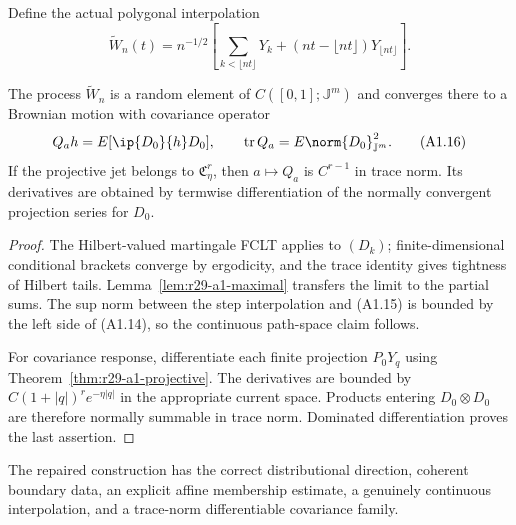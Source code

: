 Define the actual polygonal interpolation
\[
 \widetilde W_n(t)=n^{-1/2}\left[
  \sum_{k<\lfloor nt\rfloor}Y_k+
  (nt-\lfloor nt\rfloor)Y_{\lfloor nt\rfloor}\right].     \tag{A1.15}
\]

\begin{theorem}
\label{thm:r29-a1-fclt}
The process $\widetilde W_n$ is a random element of
$C([0,1];\mathbb J^m)$ and converges there to a Brownian motion with covariance
operator
\[
 Q_a h=E[\ip{D_0}{h}D_0],\qquad
 \operatorname{tr}Q_a=E\norm{D_0}_{\mathbb J^m}^2.         \tag{A1.16}
\]
If the projective jet belongs to $\mathfrak C^r_\eta$, then
$a\mapsto Q_a$ is $C^{r-1}$ in trace norm.  Its derivatives are obtained by
termwise differentiation of the normally convergent projection series for
$D_0$.
\end{theorem}

\begin{proof}
The Hilbert-valued martingale FCLT applies to $(D_k)$; finite-dimensional
conditional brackets converge by ergodicity, and the trace identity gives
tightness of Hilbert tails.  Lemma~\ref{lem:r29-a1-maximal} transfers the
limit to the partial sums.  The sup norm between the step interpolation and
(A1.15) is bounded by the left side of (A1.14), so the continuous path-space
claim follows.

For covariance response, differentiate each finite projection
$P_0Y_q$ using Theorem~\ref{thm:r29-a1-projective}.  The derivatives are
bounded by $C(1+|q|)^re^{-\eta|q|}$ in the appropriate current space.
Products entering $D_0\otimes D_0$ are therefore normally summable in trace
norm.  Dominated differentiation proves the last assertion.
\end{proof}

The repaired construction has the correct distributional direction, coherent
boundary data, an explicit affine membership estimate, a genuinely continuous
interpolation, and a trace-norm differentiable covariance family.
